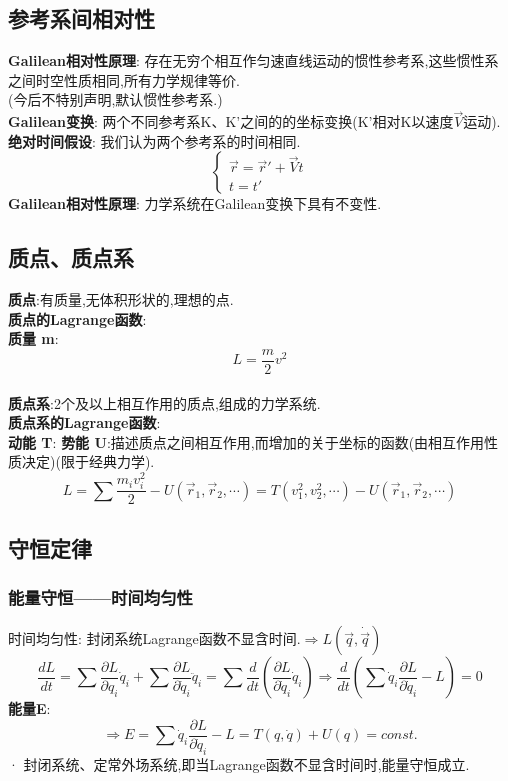\documentclass{article}
\begin{document}
\subsection{参考系间相对性}
\textbf{Galilean相对性原理}: 存在无穷个相互作匀速直线运动的惯性参考系,这些惯性系之间时空性质相同,所有力学规律等价.\\
(今后不特别声明,默认惯性参考系.)\\
\textbf{Galilean变换}: 两个不同参考系K、K'之间的的坐标变换(K'相对K以速度$\vec V$运动).\\
\textbf{绝对时间假设}: 我们认为两个参考系的时间相同.
\begin{displaymath}
    \left\{ \begin{array}{ll}
    \vec r = \vec r' + \vec V t\\
    t = t'
    \end{array} \right.
\end{displaymath}
\textbf{Galilean相对性原理}: 力学系统在Galilean变换下具有不变性.


\subsection{质点、质点系}
\textbf{质点}:有质量,无体积形状的,理想的点.\\
\textbf{质点的Lagrange函数}:\\
\textbf{质量 m}:
$$L = \frac{m}{2} v^2$$
\\
\textbf{质点系}:2个及以上相互作用的质点,组成的力学系统.\\
\textbf{质点系的Lagrange函数}:\\
\textbf{动能 T}: \quad \textbf{势能 U}:描述质点之间相互作用,而增加的关于坐标的函数(由相互作用性质决定)(限于经典力学).
$$L = \sum \frac{m_i v_i^2}{2} - U(\vec r_1,\vec r_2,\cdots ) = T(v_1^2,v_2^2,\cdots) - U(\vec r_1,\vec r_2,\cdots )$$


\subsection{守恒定律}
\subsubsection{能量守恒——时间均匀性}
时间均匀性: 封闭系统Lagrange函数不显含时间.\quad $\Rightarrow L(\vec q,\dot \vec q)$\\
$$\frac{dL}{dt} = \sum \frac{\partial L}{\partial q_i} \dot q_i + \sum \frac{\partial L}{\partial \dot q_i} \ddot q_i = \sum \frac{d}{dt}(\frac{\partial L}{\partial \dot q_i}\dot q_i)
\Rightarrow \frac{d}{dt}(\sum \dot q_i \frac{\partial L}{\partial \dot q_i} - L) = 0$$
\textbf{能量E}: 
$$\Rightarrow E = \sum \dot q_i \frac{\partial L}{\partial \dot q_i} - L  = T(q,\dot q) + U(q) = const.$$
· 封闭系统、定常外场系统,即当Lagrange函数不显含时间时,能量守恒成立.
\end{document}
